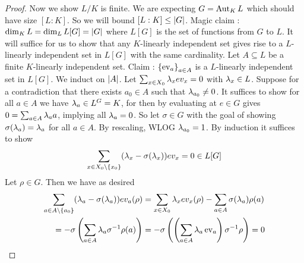 \documentclass{article}
\begin{document}
\begin{proof}
  Now we show $L / K$ is finite.
  We are expecting $G = \operatorname{Aut}_K L$ which should have size $[L : K]$.
  So we will bound $[L : K] \leq \left\vert G \right\vert$.
  Magic claim : 
  $\dim_K L = \dim_L L[G] = \left\vert G \right\vert$
  where $L[G]$ is the set of functions from $G$ to $L$.
  It will suffice for us to show that
  any $K$-linearly independent set gives rise to
  a $L$-linearly independent set in $L[G]$ with the same cardinality.
  Let $A \subseteq L$ be a finite $K$-linearly independent set.
  Claim : $\left\{\operatorname{ev}_a\right\}_{a \in A}$ is a $L$-linearly independent set in $L[G]$.
  We induct on $\left\vert A \right\vert$.
  Let $\sum_{x \in X_0} \lambda_x ev_x = 0$ with $\lambda_x \in L$. 
  Suppose for a contradiction 
  that there exists $a_0 \in A$ such that $\lambda_{a_0} \neq 0$. 
  It suffices to show for all $a \in A$
  we have $\lambda_a \in L^G = K$,
  for then by evaluating at $e \in G$ gives 
  $0 = \sum_{a \in A} \lambda_a a$,
  implying all $\lambda_a = 0$. 
  So let $\sigma \in G$ with the goal of showing $\sigma(\lambda_a) = \lambda_a$ for
  all $a \in A$.
  By rescaling, WLOG $\lambda_{a_0} = 1$. 
  By induction it suffices to show \[
    \sum_{x \in X_0 \setminus\{x_0\}} (\lambda_x - \sigma(\lambda_x)) ev_x
    = 0 \in L[G]
  \]
  Let $\rho \in G$. Then we have as desired
  \begin{align*}
    \sum_{a \in A \setminus\{a_0\}} (\lambda_a - \sigma(\lambda_a)) ev_a (\rho)
    &= \sum_{x \in X_0} \lambda_x ev_x (\rho) - 
    \sum_{a \in A} \sigma(\lambda_a) \rho(a)
    \\
    = - \sigma \left( 
        \sum_{a \in A} \lambda_a \sigma^{-1}\rho(a)
      \right)
    &= - \sigma\left(
      \left(
        \sum_{a \in A} \lambda_a \operatorname{ev}_a
      \right) \sigma^{-1}\rho
    \right)
    = 0 
  \end{align*}
\end{proof}
\end{document}
